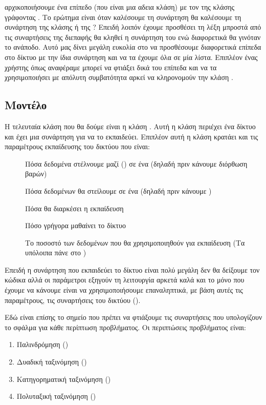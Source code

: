 αρχικοποιήσουμε ένα επίπεδο (που είναι μια αδεια κλάση) με τον  της κλάσης  γράφοντας . Το ερώτημα είναι όταν καλέσουμε τη συνάρτηση
 θα καλέσουμε τη συνάρτηση  της κλάσης  ή της ? Επειδή λοιπόν έχουμε προσθέσει τη λέξη  μπροστά από τις συναρτήσεις της διεπαφής θα
κληθεί η συνάρτηση του  ενώ διαφορετικά θα γινόταν το ανάποδο. Αυτό μας δίνει μεγάλη ευκολία στο να προσθέσουμε διαφορετικά επίπεδα στο δίκτυο με την ίδια συνάρτηση και να τα έχουμε όλα σε μία λίστα. Επιπλέον ένας χρήστης όπως
αναφέραμε μπορεί να φτιάξει δικά του επίπεδα και να τα χρησιμοποιήσει με απόλυτη συμβατότητα αρκεί να κληρονομούν την κλάση .

\subsection{Μοντέλο}
Η τελευταία κλάση που θα δούμε είναι η κλάση . Αυτή η κλάση περιέχει ένα δίκτυο και έχει μια συνάρτηση για να το εκπαιδεύει. Επιπλέον αυτή η κλάση κρατάει και τις παραμέτρους εκπαίδευσης του δικτύου που είναι:
\begin{description}
    \item[] Πόσα δεδομένα στέλνουμε μαζί () σε ένα  (δηλαδή πριν κάνουμε διόρθωση βαρών)
    \item[] Πόσα  δεδομένων θα στείλουμε σε ένα  (δηλαδή πριν κάνουμε )
    \item[] Πόσα  θα διαρκέσει η εκπαίδευση
    \item[] Πόσο γρήγορα μαθαίνει το δίκτυο
    \item[] Το ποσοστό των δεδομένων που θα χρησιμοποιηθούν για εκπαίδευση (Τα υπόλοιπα πάνε στο )
\end{description}

Επειδή η συνάρτηση που εκπαιδεύει το δίκτυο είναι πολύ μεγάλη δεν θα δείξουμε τον κώδικα αλλά οι παράμετροι εξηγούν τη λειτουργία αρκετά καλά και το μόνο που έχουμε να κάνουμε είναι να χρησιμοποιήσουμε επαναληπτικά, με βάση αυτές τις παραμέτρους, τις συναρτήσεις του δικτύου ().

Εδώ είναι επίσης το σημείο που πρέπει να φτιάξουμε τις συναρτήσεις που υπολογίζουν το σφάλμα για κάθε περίπτωση προβλήματος. Οι περιπτώσεις προβλήματος είναι:
\begin{enumerate}
    \item Παλινδρόμηση ()
    \item Δυαδική ταξινόμηση ()
    \item Κατηγορηματική ταξινόμηση ()
    \item Πολυταξική ταξινόμηση ()
\end{enumerate}

